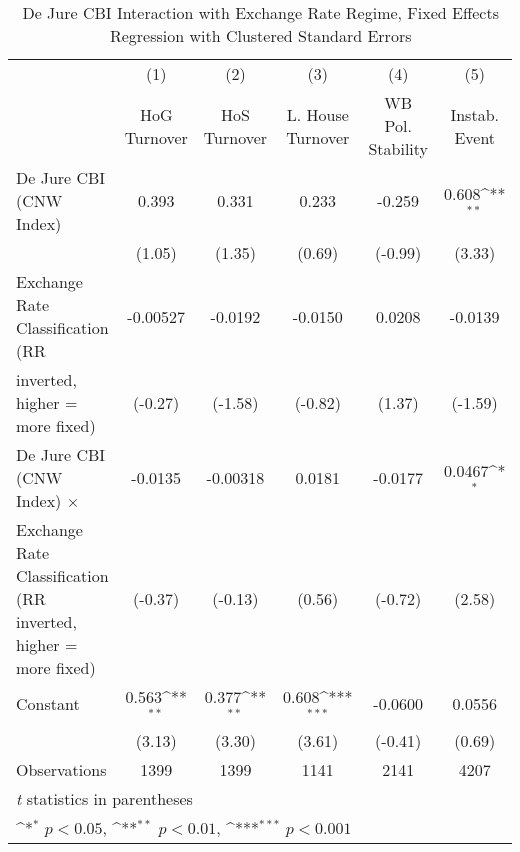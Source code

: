 \begin{table}[htbp]\centering
\def\sym#1{\ifmmode^{#1}\else\(^{#1}\)\fi}
\caption{De Jure CBI Interaction with Exchange Rate Regime, Fixed Effects Regression with Clustered Standard Errors \label{imultIndFEDJ}}
\begin{tabular}{l*{5}{c}}
\toprule
                                        &\multicolumn{1}{c}{(1)}&\multicolumn{1}{c}{(2)}&\multicolumn{1}{c}{(3)}&\multicolumn{1}{c}{(4)}&\multicolumn{1}{c}{(5)}\\
                                        &\multicolumn{1}{c}{HoG Turnover}&\multicolumn{1}{c}{HoS Turnover}&\multicolumn{1}{c}{L. House Turnover}&\multicolumn{1}{c}{WB Pol. Stability}&\multicolumn{1}{c}{Instab. Event}\\
\midrule
De Jure CBI (CNW Index)                 &    0.393         &    0.331         &    0.233         &   -0.259         &    0.608\sym{**} \\
                                        &   (1.05)         &   (1.35)         &   (0.69)         &  (-0.99)         &   (3.33)         \\
\addlinespace
Exchange Rate Classification (RR        & -0.00527         &  -0.0192         &  -0.0150         &   0.0208         &  -0.0139         \\
inverted, higher = more fixed)          &  (-0.27)         &  (-1.58)         &  (-0.82)         &   (1.37)         &  (-1.59)         \\
\addlinespace
De Jure CBI (CNW Index) $\times$        &  -0.0135         & -0.00318         &   0.0181         &  -0.0177         &   0.0467\sym{*}  \\
Exchange Rate Classification (RR inverted, higher = more fixed)&  (-0.37)         &  (-0.13)         &   (0.56)         &  (-0.72)         &   (2.58)         \\
\addlinespace
Constant                                &    0.563\sym{**} &    0.377\sym{**} &    0.608\sym{***}&  -0.0600         &   0.0556         \\
                                        &   (3.13)         &   (3.30)         &   (3.61)         &  (-0.41)         &   (0.69)         \\
\midrule
Observations                            &     1399         &     1399         &     1141         &     2141         &     4207         \\
\bottomrule
\multicolumn{6}{l}{\footnotesize \textit{t} statistics in parentheses}\\
\multicolumn{6}{l}{\footnotesize \sym{*} \(p<0.05\), \sym{**} \(p<0.01\), \sym{***} \(p<0.001\)}\\
\end{tabular}
\end{table}
